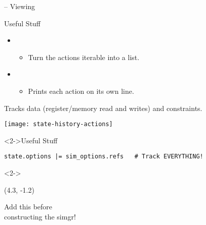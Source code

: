 \documentclass[xcolor={dvipsnames}]{beamer}
\begin{document}
\begin{frame}[fragile]{ -- Viewing}
    \begin{block}{Useful Stuff}
        \begin{itemize}
            \item {\footnotesize{}}
                  \begin{itemize}
                      \item Turn the actions iterable into a list.
                  \end{itemize}
            \item {\footnotesize{}}
                  \begin{itemize}
                      \item Prints each action on its own line.
                  \end{itemize}
        \end{itemize}
    \end{block}
\end{frame}
\begin{frame}[fragile,t]{}
    Tracks data (register/memory read and writes) and constraints.
    \vspace{-10pt}
    \begin{center}
        \texttt{[image: state-history-actions]}
    \end{center}
    \begin{block}<2->{Useful Stuff}
        \vskip-5pt
        \begin{lstlisting}[style=plainpy,gobble=12]
            state.options |= sim_options.refs   # Track EVERYTHING!
        \end{lstlisting}
    \end{block}
    \begin{overlaytextblock}
        \begin{onlyenv}<2->
            \begin{textblock}{3}(4.3, -1.2)
                \begin{rotate}{-5}
                    \tiny
                    \parbox{26mm}{Add this before \\ constructing the simgr!}
                \end{rotate}
            \end{textblock}
        \end{onlyenv}
    \end{overlaytextblock}
\end{frame}
\end{document}
